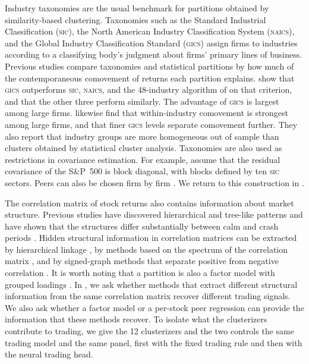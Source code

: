 Industry taxonomies are the usual benchmark for partitions obtained by
similarity-based clustering. Taxonomies such as the Standard Industrial Classification (\textsc{sic}), the North American Industry Classification System (\textsc{naics}), and the Global Industry Classification Standard (\textsc{gics}) assign firms to industries according to a classifying body's judgment about firms' primary lines of business. Previous studies compare taxonomies and statistical partitions by how much of the contemporaneous comovement of returns each partition explains.
\citet{bhojraj2003whats} show that \textsc{gics} outperforms
\textsc{sic}, \textsc{naics}, and the 48-industry algorithm of \citet{FAMA1997153} on that
criterion, and that the other three perform similarly.
The advantage of \textsc{gics} is largest among large firms.
\citet{chan2007industry} likewise find that within-industry comovement
is strongest among large firms, and that finer \textsc{gics} levels separate
comovement further. They also report that industry groups are more homogeneous out of sample than clusters obtained by statistical cluster analysis. Taxonomies are also used as restrictions in covariance estimation. For example, \citet{alves2024forecasting} assume that the residual covariance of the S\&P~500 is block diagonal, with blocks defined by ten \textsc{sic} sectors. Peers can also be chosen firm by firm \citep{bhojraj2002peer}. We return to this construction in .

The correlation matrix of stock returns also contains information about market structure. Previous studies have discovered hierarchical and tree-like patterns \citep{Mantegna1999, MantegnaStanley2000} and have shown that the structures differ substantially between calm and crash periods \citep{PhysRevE.68.056110}. Hidden structural information in correlation matrices can be extracted by hierarchical linkage \citep{TOLA2008235}, by methods based on the spectrum of the correlation matrix \citep{macmahon2015community, rohe2011spectral}, and by
signed-graph methods that separate positive from negative correlation
\citep{cucuringu2019sponge, he2022sssnet, uddin2024network}. It is worth noting that a partition is also a factor
model with grouped loadings \citep{ando2017clustering}. 
In , we ask whether methods that extract different structural information from the same correlation matrix recover different trading signals. We also ask whether a factor model or a per-stock peer regression can provide the information that these methods recover. To isolate what the clusterizers contribute to trading, we give the 12 clusterizers and the two controls the same trading model and the same panel, first with the fixed trading rule and then with the neural trading head.

